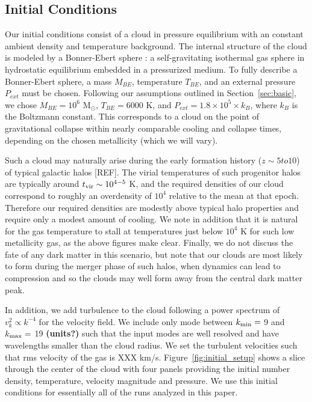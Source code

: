 \documentclass[useAMS,usenatbib]{mn2e}
\newcommand{\msun}{{M$_\odot$}}
\begin{document}

\subsection{Initial Conditions}

Our initial conditions consist of a cloud in pressure equilibrium with an
constant ambient density and temperature background. The internal structure of the
cloud is modeled by a Bonner-Ebert sphere \cite{Bonnor1956}: a self-gravitating
isothermal gas sphere in hydrostatic equilibrium embedded in a pressurized  
medium. To fully describe a Bonner-Ebert sphere, a mass $M_{BE}$, temperature
$T_{BE}$, and an external pressure $P_{ext}$ must be chosen. Following our
assumptions outlined in Section~\ref{sec:basic}, we chose
$M_{BE}=10^6$ \msun, $T_{BE}=6000$ K, and $P_{ext}=1.8\times10^5\times k_B$, 
where $k_B$ is the Boltzmann constant. This corresponds to a cloud on the point of
gravitational collapse within nearly comparable cooling and collapse times,
depending on the chosen metallicity (which we will vary).

Such a cloud may naturally arise during the early formation history ($z \sim 5 to 10$) of typical galactic halos [REF].  The virial temperatures of such progenitor halos are typically around $t_{\rm vir} \sim 10^{4-5}$ K, and the required densities of our cloud correspond to roughly an overdensity of $10^4$ relative to the mean at that epoch.  Therefore our required densities are modestly above typical halo properties and require only a modest amount of cooling.  We note in addition that it is natural for the gas temperature to stall at temperatures just below $10^4$ K for such low metallicity gas, as the above figures make clear.  Finally, we do not discuss the fate of any dark matter in this scenario, but note that our clouds are most likely to form during the merger phase of such halos, when dynamics can lead to compression and so the clouds may well form away from the central dark matter peak.

In addition, we add turbulence to the cloud following a power spectrum of
$v_k^2 \propto k^{-4}$ for the velocity field.  We include only mode between
$k_{\rm min}=$ 9 and $k_{\rm max} =$ 19 {\bf (units?)} such that the input modes are well resolved
and have wavelengths smaller than the cloud radius.  We set the turbulent velocities
such that rms velocity of the gas is XXX km/s. Figure~\ref{fig:initial_setup} shows 
a slice through the center of the cloud with four panels providing
the initial number density, temperature, velocity magnitude and pressure.  We use
this initial conditions for essentially all of the runs analyzed in this paper.
\end{document}
